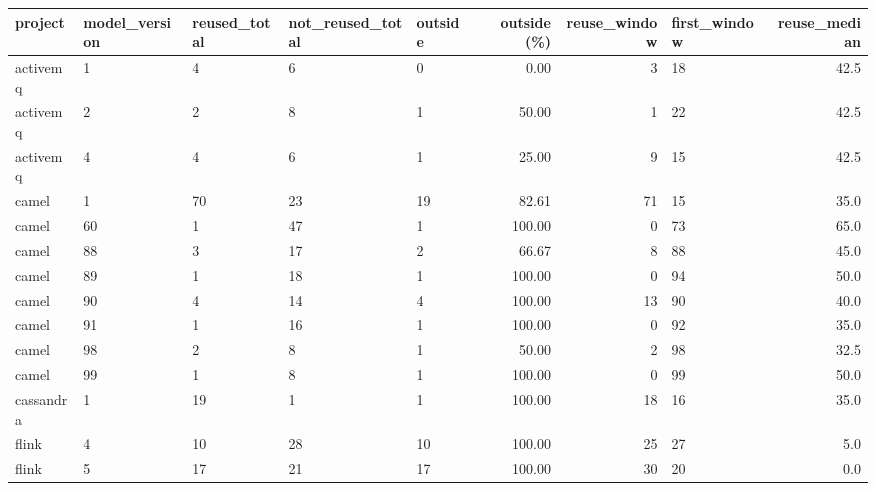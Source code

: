 \begin{tabular}{lllllrrlr}
\toprule
  project & model\_version & reused\_total & not\_reused\_total & outside &  outside (\%) &  reuse\_window & first\_window &  reuse\_median \\
\midrule
 activemq &             1 &            4 &                6 &       0 &         0.00 &             3 &           18 &          42.5 \\
 activemq &             2 &            2 &                8 &       1 &        50.00 &             1 &           22 &          42.5 \\
 activemq &             4 &            4 &                6 &       1 &        25.00 &             9 &           15 &          42.5 \\
    camel &             1 &           70 &               23 &      19 &        82.61 &            71 &           15 &          35.0 \\
    camel &            60 &            1 &               47 &       1 &       100.00 &             0 &           73 &          65.0 \\
    camel &            88 &            3 &               17 &       2 &        66.67 &             8 &           88 &          45.0 \\
    camel &            89 &            1 &               18 &       1 &       100.00 &             0 &           94 &          50.0 \\
    camel &            90 &            4 &               14 &       4 &       100.00 &            13 &           90 &          40.0 \\
    camel &            91 &            1 &               16 &       1 &       100.00 &             0 &           92 &          35.0 \\
    camel &            98 &            2 &                8 &       1 &        50.00 &             2 &           98 &          32.5 \\
    camel &            99 &            1 &                8 &       1 &       100.00 &             0 &           99 &          50.0 \\
cassandra &             1 &           19 &                1 &       1 &       100.00 &            18 &           16 &          35.0 \\
    flink &             4 &           10 &               28 &      10 &       100.00 &            25 &           27 &           5.0 \\
    flink &             5 &           17 &               21 &      17 &       100.00 &            30 &           20 &           0.0 \\

\end{tabular}
